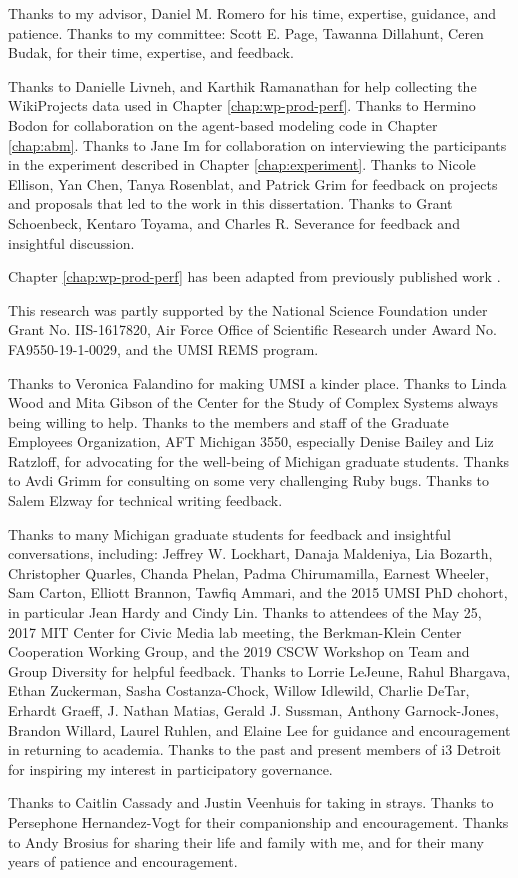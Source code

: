 Thanks to my advisor, Daniel M. Romero for his time, expertise, guidance, and patience.
Thanks to my committee:
Scott E. Page,
Tawanna Dillahunt,
Ceren Budak,
for their time, expertise, and feedback.

Thanks to Danielle Livneh, and Karthik Ramanathan for help collecting the WikiProjects data used in Chapter \ref{chap:wp-prod-perf}.
Thanks to Hermino Bodon for collaboration on the agent-based modeling code in Chapter \ref{chap:abm}.
Thanks to Jane Im for collaboration on interviewing the participants in the experiment described in Chapter \ref{chap:experiment}.
Thanks to Nicole Ellison, Yan Chen, Tanya Rosenblat, and Patrick Grim for feedback on projects and proposals that led to the work in this dissertation.
Thanks to Grant Schoenbeck, Kentaro Toyama, and Charles R. Severance for feedback and insightful discussion.

Chapter \ref{chap:wp-prod-perf} has been adapted from previously published work \cite{platt_network_2018}.

This research was partly supported by
the National Science Foundation under Grant No. IIS-1617820,
Air Force Office of Scientific Research under Award No. FA9550-19-1-0029,
and the UMSI REMS program.

Thanks to Veronica Falandino for making UMSI a kinder place.
Thanks to Linda Wood and Mita Gibson of the Center for the Study of Complex Systems always being willing to help. 
Thanks to the members and staff of the Graduate Employees Organization, AFT Michigan 3550, especially Denise Bailey and Liz Ratzloff, for advocating for the well-being of Michigan graduate students.
Thanks to Avdi Grimm for consulting on some very challenging Ruby bugs.
Thanks to Salem Elzway for technical writing feedback.

Thanks to many Michigan graduate students for feedback and insightful conversations, including:
Jeffrey W. Lockhart,
Danaja Maldeniya,
Lia Bozarth,
Christopher Quarles,
Chanda Phelan,
Padma Chirumamilla,
Earnest Wheeler,
Sam Carton,
Elliott Brannon,
Tawfiq Ammari,
and the 2015 UMSI PhD chohort,
in particular Jean Hardy and Cindy Lin.
Thanks to attendees of the May 25, 2017 MIT Center for Civic Media lab meeting,
the Berkman-Klein Center Cooperation Working Group,
and the 2019 CSCW Workshop on Team and Group Diversity
for helpful feedback.
Thanks to
Lorrie LeJeune,
Rahul Bhargava,
Ethan Zuckerman,
Sasha Costanza-Chock,
Willow Idlewild,
Charlie DeTar,
Erhardt Graeff,
J. Nathan Matias,
Gerald J. Sussman,
Anthony Garnock-Jones,
Brandon Willard,
Laurel Ruhlen,
and Elaine Lee
for guidance and encouragement in returning to academia.
Thanks to the past and present members of i3 Detroit for inspiring my interest in participatory governance.

Thanks to Caitlin Cassady and Justin Veenhuis for taking in strays.
Thanks to Persephone Hernandez-Vogt for their companionship and encouragement.
Thanks to Andy Brosius for sharing their life and family with me, and for their many years of patience and encouragement.
